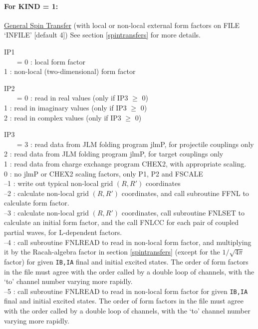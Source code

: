 \documentclass[11pt]{article}
\begin{document}
\begin{description}
\paragraph{For KIND = 1:} 
\underline{General Spin Transfer}
(with local or non-local external form factors on FILE `INFILE' [default 4])
See section \ref{spintransfers} for more details.

IP1\\
~~~  = 0 : local form factor
\\   1 : non-local (two-dimensional) form factor



IP2\\
~~~  = 0 : read in real values      (only if IP3 $\geq$ 0)
\\   1 : read in imaginary values    (only if IP3 $\geq$ 0)
\\   2 : read in complex values        (only if IP3 $\geq$ 0)



 IP3\\
~~~  = 3 : read data from JLM folding program jlmP, for projectile couplings only
\\  2 : read data from JLM folding program jlmP, for target couplings only
\\   1 : read data from charge exchange program CHEX2, with appropriate scaling.
\\   0 : no jlmP or CHEX2 scaling factors, only P1, P2 and FSCALE
\\  --1 : write out typical non-local grid $(R,R')$ coordinates
\\  --2 : calculate non-local grid $(R,R')$ coordinates,
and call subroutine FFNL to calculate form factor.
\\  --3 : calculate non-local grid $(R,R')$ coordinates,
call subroutine FNLSET to calculate an initial form factor, and the call
FNLCC for each pair of coupled partial waves, for L-dependent factors.
\\ --4 : call subroutine FNLREAD to read in non-local form factor, and multiplying it by the Racah-algebra factor
in section \ref{spintransfers} (except for the $1/\sqrt{4\pi}$ factor) for given {\tt IB,IA} final and initial excited states. 
The order of form factors in the file must agree with the order called by a double loop of channels, with the `to' channel number varying more rapidly.
\\ --5 : call subroutine FNLREAD to read in non-local form factor for given {\tt IB,IA} final and initial excited states. 
The order of form factors in the file must agree with the order called by a double loop of channels, with the `to' channel number varying more rapidly.




\end{description}
\end{document}
